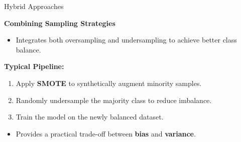 \documentclass[serif, aspectratio=169]{beamer}
\begin{document}
\begin{frame}{Hybrid Approaches}

\textbf{Combining Sampling Strategies}

\begin{itemize}\itemsep0.8em
    \item Integrates both oversampling and undersampling to achieve better class balance.
\end{itemize}

\vspace{0.5em}

\textbf{Typical Pipeline:}
\begin{enumerate}\itemsep0.6em
    \item Apply \textbf{SMOTE} to synthetically augment minority samples.
    \item Randomly undersample the majority class to reduce imbalance.
    \item Train the model on the newly balanced dataset.
\end{enumerate}

\vspace{0.6em}

\begin{itemize}\itemsep0.6em
    \item Provides a practical trade-off between \textbf{bias} and \textbf{variance}.
\end{itemize}

\end{frame}
\end{document}
